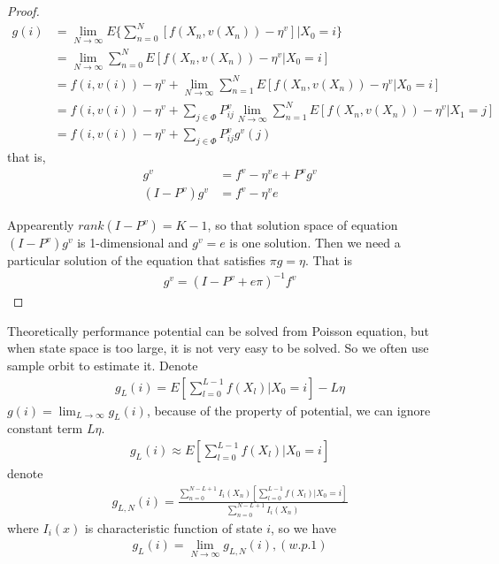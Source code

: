 \documentclass[runningheads]{llncs}
\begin{document}
    \begin{proof}
    \begin{align}
        g(i) &= \mathop{\lim}_{N \rightarrow \infty} E \{ \sum_{n=0}^N [f(X_n, v(X_n)) - \eta^v] | X_0 = i \} \\
        &= \mathop{\lim}_{N \rightarrow \infty}  \sum_{n=0}^N E [f(X_n, v(X_n)) - \eta^v | X_0 = i ] \\
        &= f(i, v(i)) - \eta^v + \mathop{\lim}_{N \rightarrow \infty} \sum_{n=1}^N E [f(X_n, v(X_n)) - \eta^v | X_0 = i ] \\
        &= f(i, v(i)) - \eta^v + \sum_{j \in \Phi} P^v_{ij} \mathop{\lim}_{N \rightarrow \infty} \sum_{n=1}^N E [f(X_n, v(X_n)) - \eta^v | X_1 = j ] \\
        &= f(i, v(i)) - \eta^v + \sum_{j \in \Phi} P^v_{ij} g^v(j)
    \end{align}
    that is,
    \begin{align}
        g^v &= f^v - \eta^v e + P^v g^v \\
        (I - P^v)g^v &= f^v - \eta^v e
    \end{align}
    \par
    Appearently $rank (I - P^v) = K - 1$, so that solution space of equation $(I - P^v) g^v$ is 1-dimensional
    and $g^v = e$ is one solution. Then we need a particular solution of the equation that satisfies $\pi g = \eta$.
    That is 
    \begin{align}
        g^v = (I - P^v + e\pi)^{-1}f^v
    \end{align} 
    \end{proof}

    Theoretically performance potential can be solved from Poisson equation,
    but when state space is too large, it is not very easy to be solved.
    So we often use sample orbit to estimate it. Denote
    \begin{align}
        g_L(i) = E[\sum_{l=0}^{L-1}f(X_l)|X_0=i] - L\eta
    \end{align}
    $g(i) = \mathop{\lim}_{L \rightarrow \infty} g_L(i)$, because of the property of potential,
    we can ignore constant term $L\eta$.
    \begin{align}
        g_L(i) \approx E[\sum_{l=0}^{L-1}f(X_l)|X_0=i]
    \end{align}
    denote
    \begin{align}
        g_{L,N}(i) = \frac{\sum_{n=0}^{N-L+1} I_i(X_n) [\sum_{l=0}^{L-1}f(X_l)|X_0=i]}{\sum_{n=0}^{N-L+1} I_i(X_n)}
    \end{align}
    where $I_i(x)$ is characteristic function of state $i$, so we have
    \begin{align}
        g_L(i) = \mathop{\lim}_{N\rightarrow \infty} g_{L,N}(i), (w.p.1)
    \end{align}
\end{document}
